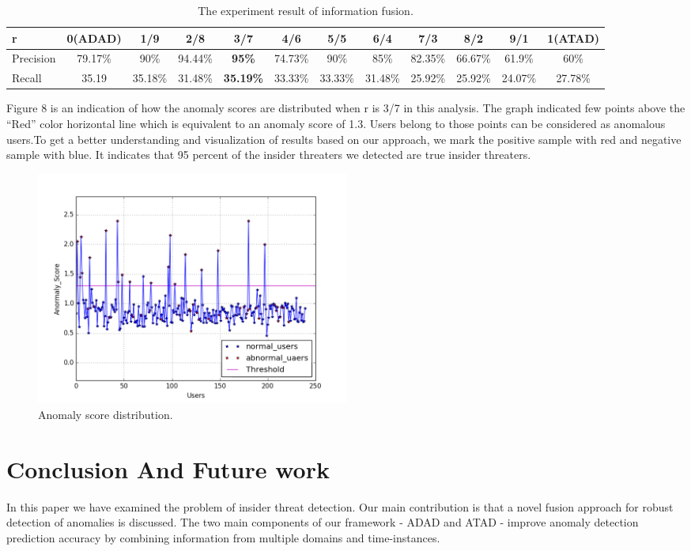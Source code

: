 \documentclass[conference]{IEEEtran}
\begin{document}
\begin{table}[tbp]
\caption{The experiment result of information fusion.}
\centering  %
\begin{tabular}{lccccccccccc}  %
\hline
r &0(ADAD)&1/9 &2/8 &3/7 &4/6 &5/5 &6/4 &7/3 &8/2 &9/1 &1(ATAD)\\\hline

Precision &79.17\% &90\% &94.44\% &\textbf{95\%}&74.73\%&90\%  &85\% &82.35\% &66.67\%&61.9\%&60\% \\\hline

Recall &35.19 &35.18\% &31.48\% &\textbf{35.19\%}&33.33\%&33.33\%&31.48\%&25.92\%&25.92\%&24.07\%&27.78\%\\\hline
\end{tabular}

\end{table}

Figure 8 is an indication of how the anomaly scores are distributed when r is 3/7 in this analysis. The graph indicated few points above the “Red” color horizontal line which is equivalent to an anomaly score of 1.3. Users belong to those points can be considered as anomalous users.To get a better understanding and visualization of results based on our approach, we mark the positive sample with red and negative sample with blue. It indicates that 95 percent of the insider threaters we detected are true insider threaters.  

\begin{figure}[htb]
\centerline{\includegraphics[width = 0.5\textwidth]{figure/figure8.png}}
\caption{Anomaly score distribution.}
\label{fig}
\end{figure}

\section{Conclusion And Future work}

In this paper we have examined the problem of insider threat detection. Our main contribution is that a novel fusion approach for robust detection of anomalies is discussed. The two main components of our framework - ADAD and ATAD - improve anomaly detection prediction accuracy by combining information from multiple domains and time-instances.
\end{document}
